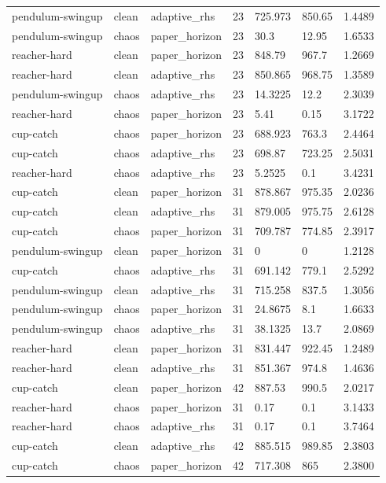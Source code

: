 \begin{tabular}{lllllll}
pendulum-swingup & clean & adaptive\_rhs & 23 & 725.973 & 850.65 & 1.4489 \\
pendulum-swingup & chaos & paper\_horizon & 23 & 30.3 & 12.95 & 1.6533 \\
reacher-hard & clean & paper\_horizon & 23 & 848.79 & 967.7 & 1.2669 \\
reacher-hard & clean & adaptive\_rhs & 23 & 850.865 & 968.75 & 1.3589 \\
pendulum-swingup & chaos & adaptive\_rhs & 23 & 14.3225 & 12.2 & 2.3039 \\
reacher-hard & chaos & paper\_horizon & 23 & 5.41 & 0.15 & 3.1722 \\
cup-catch & chaos & paper\_horizon & 23 & 688.923 & 763.3 & 2.4464 \\
cup-catch & chaos & adaptive\_rhs & 23 & 698.87 & 723.25 & 2.5031 \\
reacher-hard & chaos & adaptive\_rhs & 23 & 5.2525 & 0.1 & 3.4231 \\
cup-catch & clean & paper\_horizon & 31 & 878.867 & 975.35 & 2.0236 \\
cup-catch & clean & adaptive\_rhs & 31 & 879.005 & 975.75 & 2.6128 \\
cup-catch & chaos & paper\_horizon & 31 & 709.787 & 774.85 & 2.3917 \\
pendulum-swingup & clean & paper\_horizon & 31 & 0 & 0 & 1.2128 \\
cup-catch & chaos & adaptive\_rhs & 31 & 691.142 & 779.1 & 2.5292 \\
pendulum-swingup & clean & adaptive\_rhs & 31 & 715.258 & 837.5 & 1.3056 \\
pendulum-swingup & chaos & paper\_horizon & 31 & 24.8675 & 8.1 & 1.6633 \\
pendulum-swingup & chaos & adaptive\_rhs & 31 & 38.1325 & 13.7 & 2.0869 \\
reacher-hard & clean & paper\_horizon & 31 & 831.447 & 922.45 & 1.2489 \\
reacher-hard & clean & adaptive\_rhs & 31 & 851.367 & 974.8 & 1.4636 \\
cup-catch & clean & paper\_horizon & 42 & 887.53 & 990.5 & 2.0217 \\
reacher-hard & chaos & paper\_horizon & 31 & 0.17 & 0.1 & 3.1433 \\
reacher-hard & chaos & adaptive\_rhs & 31 & 0.17 & 0.1 & 3.7464 \\
cup-catch & clean & adaptive\_rhs & 42 & 885.515 & 989.85 & 2.3803 \\
cup-catch & chaos & paper\_horizon & 42 & 717.308 & 865 & 2.3800 \\

\end{tabular}
